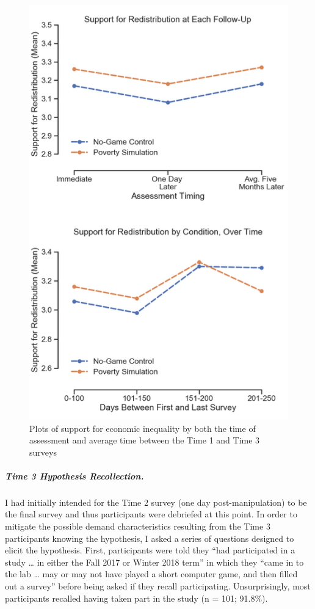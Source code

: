 \documentclass{sfuthesis}
\begin{document}
\begin{figure}
  \includegraphics[scale=.75]{Fig3-4.png}
  \caption{Plots of support for economic inequality by both the time of assessment and average time between the Time 1 and Time 3 surveys}
  \label{fig:sixthfig}
\end{figure}

\subparagraph{Time 3 Hypothesis Recollection.} I had initially intended for the Time 2 survey (one day post-manipulation) to be the final survey and thus participants were debriefed at this point. In order to mitigate the possible demand characteristics resulting from the Time 3 participants knowing the hypothesis, I asked a series of questions designed to elicit the hypothesis. First, participants were told they “had participated in a study … in either the Fall 2017 or Winter 2018 term” in which they “came in to the lab … may or may not have played a short computer game, and then filled out a survey” before being asked if they recall participating. Unsurprisingly, most participants recalled having taken part in the study (n = 101; 91.8\%).
\end{document}
